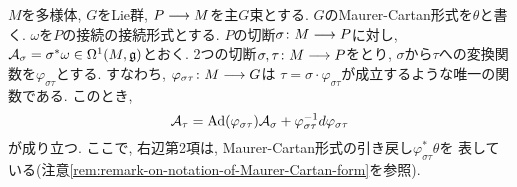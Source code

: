\begin{thm}
\label{thm:gauge-field-transformation-formula}
$M$を多様体, $G$をLie群,
$P \longrightarrow M$を主$G$束とする.
$G$のMaurer-Cartan形式を$\theta$と書く.
$\omega$を$P$の接続の接続形式とする.
$P$の切断$\sigma \colon M \longrightarrow P$に対し,
$\mathcal{A}_\sigma = \sigma^* \omega \in \Omega^1(M, \mathfrak{g})$とおく.
2つの切断$\sigma, \tau \colon M \longrightarrow P$をとり,
$\sigma$から$\tau$への変換関数を$\varphi_{\sigma\tau}$とする.
すなわち, $\varphi_{\sigma\tau} \colon M \longrightarrow G$は $\tau = \sigma \cdot \varphi_{\sigma\tau}$が成立するような唯一の関数である.
このとき,
\begin{equation}
\label{physicists-expression-of-connection-transformation-law}
\mathcal{A}_\tau = \operatorname{Ad}(\varphi_{\sigma\tau})\mathcal{A}_\sigma + \varphi_{\sigma\tau}^{-1} d\varphi_{\sigma\tau}
\end{equation}
が成り立つ.
ここで, 右辺第2項は, Maurer-Cartan形式の引き戻し$\varphi_{\sigma\tau}^* \theta$を
表している(注意\ref{rem:remark-on-notation-of-Maurer-Cartan-form}を参照).
\end{thm}

